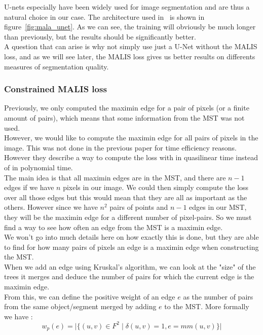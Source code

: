 U-nets especially have been widely used for image segmentation and are thus a
natural choice in our case. The architecture used in~\cite{funke_large_2019}
is shown in figure~\ref{fig:mala_unet}. As we can see, the training will
obviously be much longer than previously, but the results should be
significantly better.\\
A question that can arise is why not simply use just a U-Net without the MALIS
loss, and as we will see later, the MALIS loss gives us better results on
differents measures of segmentation quality.


\subsubsection{Constrained MALIS loss}

Previously, we only computed the maximin edge for a pair of pixels (or a finite
amount of pairs), which means that some information from the MST was not
used.\\
However, we would like to compute the maximin edge for all pairs of pixels in
the image. This was not done in the previous paper for time efficiency
reasons.\\
However they describe a way to compute the loss with in quasilinear time instead
of in polynomial time.\\

The main idea is that all maximin edges are in the MST, and there are $n-1$
edges if we have $n$ pixels in our image. We could then simply compute the loss
over all those edges but this would mean that they are all as important as the
others. However since we have $n^2$ pairs of points and $n-1$ edges in our MST,
they will be the maximin edge for a different number of pixel-pairs. So we must
find a way to see how often an edge from the MST is a maximin edge.\\

We won't go into much details here on how exactly this is done, but they are
able to find for how many pairs of pixels an edge is a maximin edge when
constructing the MST.\\
When we add an edge using Kruskal's algorithm, we can look at the "size" of the
trees it merges and deduce the number of pairs for which the current edge is
the maximin edge.\\

From this, we can define the positive weight of an edge $e$ as the number of pairs
from the same object/segment merged by adding $e$ to the MST. More formally we
have :
\begin{equation*}
	w_p(e)=\lvert \{(u,v)\in F^2 \;|\;\delta(u,v)=1, e=mm(u,v) \}   \rvert
\end{equation*}

